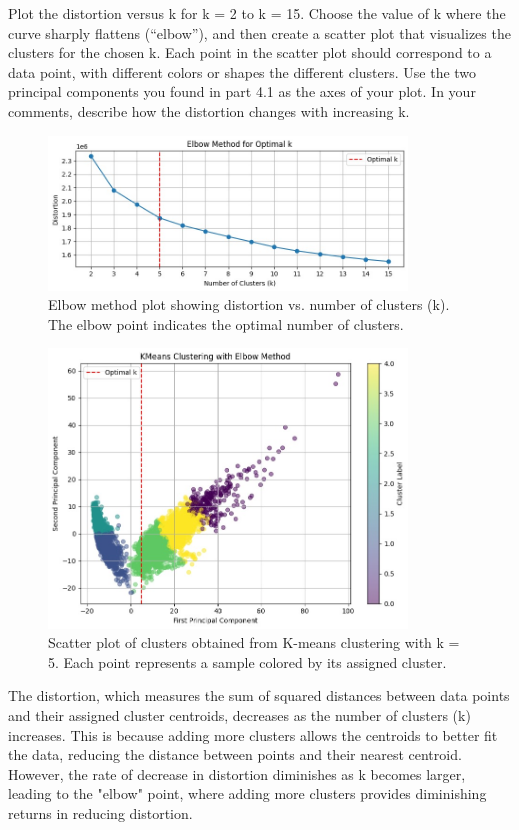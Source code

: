 \documentclass[a3paper,12pt]{extarticle} %
\begin{document}
\begin{enumerate}
\begin{itemize}
Plot the distortion versus k for k = 2 to k = 15. Choose the value of k where the curve sharply flattens (``elbow''), and then create a scatter plot that visualizes the clusters for the chosen k. Each point in the scatter plot should correspond to a data point, with different colors or shapes the different clusters. Use the two principal components you found in part 4.1 as the axes of your plot. In your comments, describe how the distortion changes with increasing k.
\begin{figure}[H]
    \centering
    \includegraphics[width=0.85\textwidth]{elbow4.2.jpg}
    \caption{Elbow method plot showing distortion vs. number of clusters (k). The elbow point indicates the optimal number of clusters.}
    \label{fig:elbow-method}
\end{figure}
\begin{figure}[H]
    \centering
    \includegraphics[width=0.85\textwidth]{kmeans4.2.jpg}
    \caption{Scatter plot of clusters obtained from K-means clustering with k = 5. Each point represents a sample colored by its assigned cluster.}
    \label{fig:kmeans-clusters}
\end{figure}
The distortion, which measures the sum of squared distances between data points and their assigned cluster centroids, decreases as the number of clusters (k) increases. This is because adding more clusters allows the centroids to better fit the data, reducing the distance between points and their nearest centroid. However, the rate of decrease in distortion diminishes as k becomes larger, leading to the "elbow" point, where adding more clusters provides diminishing returns in reducing distortion.\\


\end{itemize}
\end{enumerate}
\end{document}
